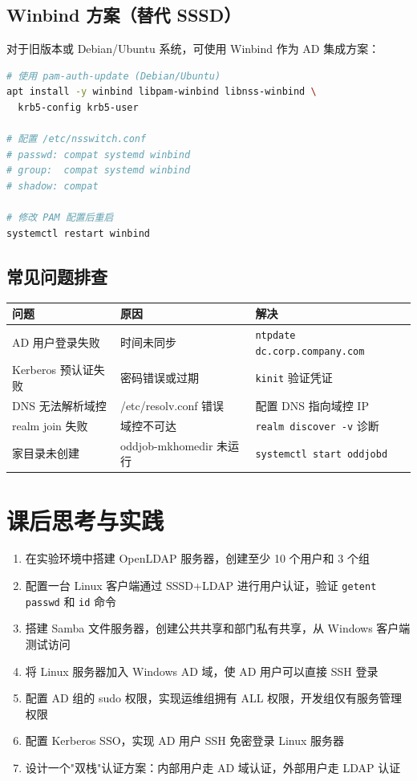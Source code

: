 \documentclass[12pt,UTF8]{ctexbook}
\begin{document}
\subsection{Winbind 方案（替代 SSSD）}

对于旧版本或 Debian/Ubuntu 系统，可使用 Winbind 作为 AD 集成方案：

\begin{lstlisting}[language=bash]
# 使用 pam-auth-update (Debian/Ubuntu)
apt install -y winbind libpam-winbind libnss-winbind \
  krb5-config krb5-user

# 配置 /etc/nsswitch.conf
# passwd: compat systemd winbind
# group:  compat systemd winbind
# shadow: compat

# 修改 PAM 配置后重启
systemctl restart winbind
\end{lstlisting}

\subsection{常见问题排查}

\begin{tabular}{|p{3.5cm}|p{4.5cm}|p{4.5cm}|}
\hline
\textbf{问题} & \textbf{原因} & \textbf{解决} \\
\hline
AD 用户登录失败 & 时间未同步 & \texttt{ntpdate dc.corp.company.com} \\
\hline
Kerberos 预认证失败 & 密码错误或过期 & \texttt{kinit} 验证凭证 \\
\hline
DNS 无法解析域控 & /etc/resolv.conf 错误 & 配置 DNS 指向域控 IP \\
\hline
realm join 失败 & 域控不可达 & \texttt{realm discover -v} 诊断 \\
\hline
家目录未创建 & oddjob-mkhomedir 未运行 & \texttt{systemctl start oddjobd} \\
\hline
\end{tabular}

\section{课后思考与实践}
\label{sec:cross-platform-practice}
\begin{enumerate}
    \item 在实验环境中搭建 OpenLDAP 服务器，创建至少 10 个用户和 3 个组
    \item 配置一台 Linux 客户端通过 SSSD+LDAP 进行用户认证，验证 \texttt{getent passwd} 和 \texttt{id} 命令
    \item 搭建 Samba 文件服务器，创建公共共享和部门私有共享，从 Windows 客户端测试访问
    \item 将 Linux 服务器加入 Windows AD 域，使 AD 用户可以直接 SSH 登录
    \item 配置 AD 组的 sudo 权限，实现运维组拥有 ALL 权限，开发组仅有服务管理权限
    \item 配置 Kerberos SSO，实现 AD 用户 SSH 免密登录 Linux 服务器
    \item 设计一个"双栈"认证方案：内部用户走 AD 域认证，外部用户走 LDAP 认证
\end{enumerate}
\end{document}
